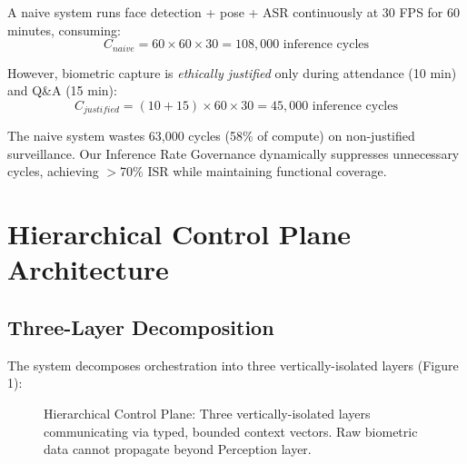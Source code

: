 \documentclass[conference]{IEEEtran}
\begin{document}
A naive system runs face detection + pose + ASR continuously at 30 FPS for 60 minutes, consuming:
$$C_{naive} = 60 \times 60 \times 30 = 108,000 \text{ inference cycles}$$

However, biometric capture is \textit{ethically justified} only during attendance (10 min) and Q\&A (15 min):
$$C_{justified} = (10 + 15) \times 60 \times 30 = 45,000 \text{ inference cycles}$$

The naive system wastes 63,000 cycles (58\% of compute) on non-justified surveillance. Our Inference Rate Governance dynamically suppresses unnecessary cycles, achieving $>$70\% ISR while maintaining functional coverage.

\section{Hierarchical Control Plane Architecture}

\subsection{Three-Layer Decomposition}
The system decomposes orchestration into three vertically-isolated layers (Figure 1):


\begin{figure}[htbp]
\centering
{}
\caption{Hierarchical Control Plane: Three vertically-isolated layers communicating via typed, bounded context vectors. Raw biometric data cannot propagate beyond Perception layer.}
\label{fig:arch}
\end{figure}
\end{document}
